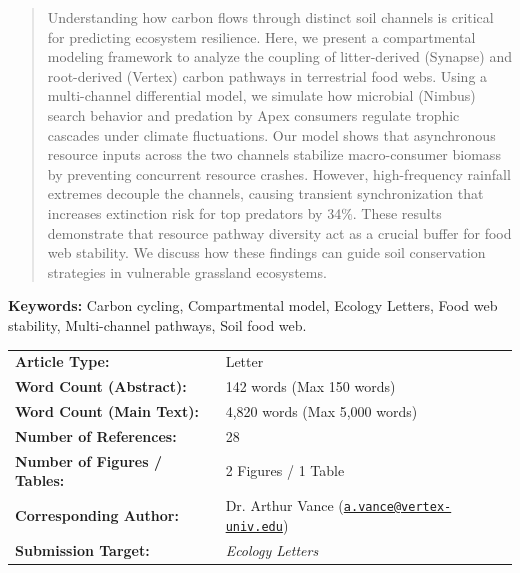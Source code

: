 \begin{abstract}
\noindent
Understanding how carbon flows through distinct soil channels is critical for predicting ecosystem resilience. 
Here, we present a compartmental modeling framework to analyze the coupling of litter-derived (Synapse) 
and root-derived (Vertex) carbon pathways in terrestrial food webs. Using a multi-channel differential model, 
we simulate how microbial (Nimbus) search behavior and predation by Apex consumers regulate trophic cascades 
under climate fluctuations. Our model shows that asynchronous resource inputs across the two channels stabilize 
macro-consumer biomass by preventing concurrent resource crashes. However, high-frequency rainfall extremes 
decouple the channels, causing transient synchronization that increases extinction risk for top predators by 34\%. 
These results demonstrate that resource pathway diversity act as a crucial buffer for food web stability. 
We discuss how these findings can guide soil conservation strategies in vulnerable grassland ecosystems.
\end{abstract}

\vspace{0.5cm}
\noindent \textbf{Keywords:} Carbon cycling, Compartmental model, Ecology Letters, Food web stability, Multi-channel pathways, Soil food web.

\begin{metadata-box}
\begin{spacing}{1.1}
\sffamily\small
\begin{tabularx}{\textwidth}{lX}
\textbf{Article Type:} & Letter \\
\textbf{Word Count (Abstract):} & 142 words (Max 150 words) \\
\textbf{Word Count (Main Text):} & 4,820 words (Max 5,000 words) \\
\textbf{Number of References:} & 28 \\
\textbf{Number of Figures / Tables:} & 2 Figures / 1 Table \\
\textbf{Corresponding Author:} & Dr. Arthur Vance (\href{mailto:a.vance@vertex-univ.edu}{\texttt{a.vance@vertex-univ.edu}}) \\
\textbf{Submission Target:} & \textit{Ecology Letters} \\
\end{tabularx}
\end{spacing}
\end{metadata-box}
